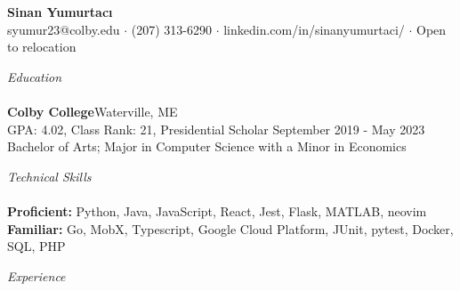 \documentclass[letterpaper]{article}
\newcommand{\lineunder} {
    \vspace*{-8pt} \\
    \hspace*{-3pt} \hrulefill \\
}
\newcommand{\header} [1] {
	{\hspace*{-3pt}\vspace*{6pt} \textit{#1}}
    \vspace*{-6pt} \lineunder
}
\begin{document}
\vspace*{-40pt}


\vspace*{-10pt}
\begin{center}
	{\Large \textbf {Sinan Yumurtacı}}\\
	 syumur23@colby.edu $\cdot$ (207) 313-6290 $\cdot$
	 linkedin.com/in/sinanyumurtaci/ $\cdot$ Open to relocation \\
\end{center}




\header{Education}
\textbf{Colby College}\hfill Waterville, ME\\
GPA: 4.02, Class Rank: 21, Presidential Scholar \hfill September 2019 - May 2023\\
Bachelor of Arts; Major in Computer Science with a Minor in Economics \\
\vspace{3mm}



\header{Technical Skills}
\vspace{1mm}
\textbf{Proficient:} Python, Java, JavaScript, React, Jest, Flask, MATLAB, neovim\\
\textbf{Familiar:} Go, MobX, Typescript, Google Cloud Platform, JUnit, pytest, Docker, SQL, PHP\\
\vspace{2mm}

\header{Experience}
\vspace{-1mm}
\end{document}
